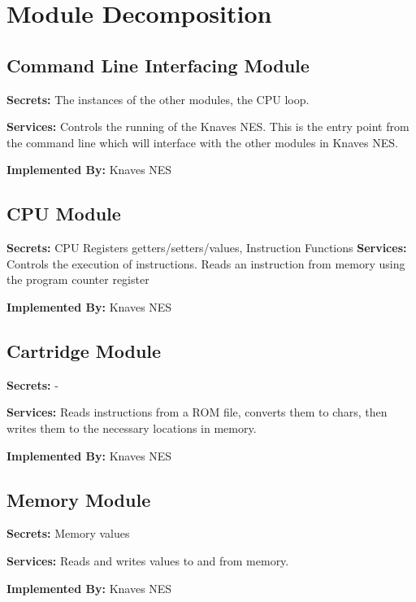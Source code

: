 \documentclass[12pt]{article}
\begin{document}
\section{Module Decomposition}
	\subsection{Command Line Interfacing Module}
		\textbf{Secrets: } The instances of the other modules, the CPU loop.

		\textbf{Services: } Controls the running of the Knaves NES. This is the entry point from the command line which will interface with the other modules in Knaves NES.

		\textbf{Implemented By: } Knaves NES

	\subsection{CPU Module}
		\textbf{Secrets: } CPU Registers getters/setters/values, Instruction Functions
		\textbf{Services: } Controls the execution of instructions. Reads an instruction from memory using the program counter register

		\textbf{Implemented By: } Knaves NES

	\subsection{Cartridge Module}
		\textbf{Secrets: } -

		\textbf{Services: } Reads instructions from a ROM file, converts them to chars, then writes them to the necessary locations in memory.

		\textbf{Implemented By: } Knaves NES

	\subsection{Memory Module}
		\textbf{Secrets: } Memory values

		\textbf{Services: } Reads and writes values to and from memory.

		\textbf{Implemented By: } Knaves NES
\end{document}

